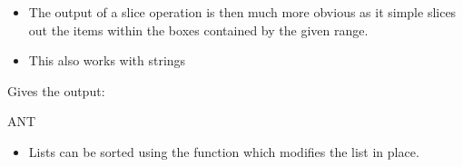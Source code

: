 \documentclass[letterpaper,10pt,english,openany]{sphinxmanual}
\begin{document}
\begin{figure}[H]
\centering

\noindent{}
\end{figure}
\begin{itemize}
\item {} 
The output of a slice operation is then much more obvious as it
simple slices out the items within the boxes contained by the given
range.

\item {} 
This also works with strings

\end{itemize}

\begin{sphinxVerbatim}[commandchars=\\\{\}]
  \PYG{p}{[}    \PYG{p}{]}
\PYG{p}{[}\PYG{p}{]}

  
\PYG{p}{[}\PYG{p}{]}
\end{sphinxVerbatim}

Gives the output:

\begin{sphinxVerbatim}
ANT
\end{sphinxVerbatim}
\begin{itemize}
\item {} 
Lists can be sorted using the  function which modifies the
list in place.

\end{itemize}

\begin{sphinxVerbatim}[commandchars=\\\{\}]
  \PYG{p}{[}\PYG{p}{]}
\end{sphinxVerbatim}
\end{document}
